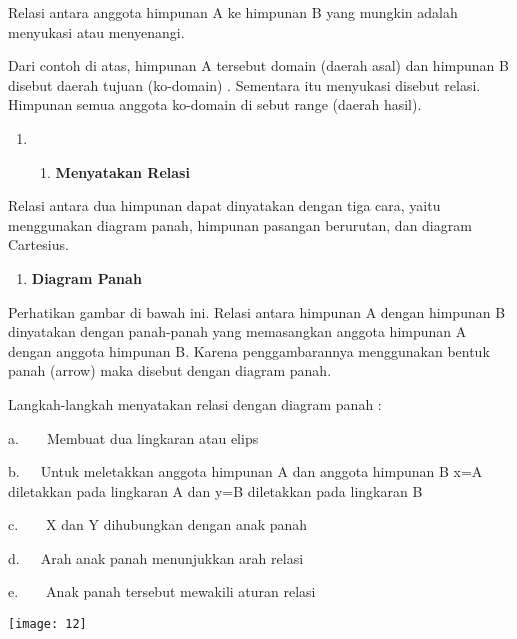 \documentclass[11pt,fleqn]{book} %
\begin{document}
\noindent Relasi antara anggota himpunan A ke himpunan B yang mungkin adalah menyukasi atau menyenangi.

\noindent Dari contoh di atas, himpunan A tersebut domain (daerah asal) dan himpunan B disebut daerah tujuan (ko-domain) . Sementara itu menyukasi disebut relasi. Himpunan semua anggota ko-domain di sebut range (daerah hasil).

\noindent 

\begin{enumerate}
\item \begin{enumerate}
\item  \textbf{Menyatakan Relasi}
\end{enumerate}
\end{enumerate}

\noindent 

Relasi antara dua himpunan dapat dinyatakan dengan tiga cara, yaitu menggunakan diagram panah, himpunan pasangan berurutan, dan diagram Cartesius.



\begin{enumerate}
\item  \textbf{Diagram Panah}
\end{enumerate}

\noindent 

\noindent Perhatikan gambar di bawah ini. Relasi antara himpunan A dengan himpunan B dinyatakan dengan panah-panah yang memasangkan anggota himpunan A dengan anggota himpunan B. Karena penggambarannya menggunakan bentuk panah (arrow) maka disebut dengan diagram panah.

\noindent 

\noindent Langkah-langkah menyatakan relasi dengan diagram panah :

\noindent 

\noindent a.~~~~Membuat dua lingkaran atau elips

\noindent b.~~~Untuk meletakkan anggota himpunan A dan anggota himpunan B x=A diletakkan pada lingkaran A dan y=B diletakkan pada lingkaran B

\noindent c.~~~~X dan Y dihubungkan dengan anak panah

\noindent d.~~~Arah anak panah menunjukkan arah relasi

\noindent e.~~~~Anak panah tersebut mewakili aturan relasi

\noindent 

\begin{center}
\noindent \texttt{[image: 12]}
\end{center}
\end{document}
